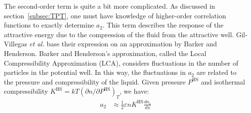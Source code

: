 \documentclass[letterpaper,twocolumn,amsmath,amssymb,prb]{revtex4-1}
\newcommand{\fixme}[1]{\textcolor{red}{\textbf{[#1]}}}
\begin{document}


The second-order term is quite a bit more complicated. As discussed in
section~\ref{subsec:TPT}, one must have knowledge of higher-order
correlation functions to exactly determine $a_2$. This term describes the
response of the attractive energy due to the compression of the fluid
from the attractive well. Gil-Villegas \emph{et al.} base their
expression on an approximation by Barker and Henderson.\cite{Barker67}
Barker and Henderson's approximation, called the Local Compressibility
Approximation (LCA), considers fluctuations in the number of particles
in the potential well. In this way, the fluctuations in $a_2$ are
related to the pressure and compressibility of the liquid. Given
pressure $P^\text{HS}$ and isothermal compressibility $K^\text{HS} =
kT\left(\partial n /\partial P^\text{HS}\right)_T$, we have:
\begin{align}
  a_2 &\approx \frac{1}{2}\varepsilon n K^\text{HS}\frac{da_1}{dn}
\end{align}
\end{document}
